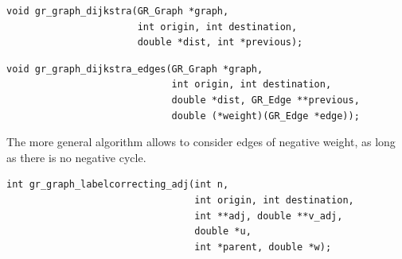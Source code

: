 \begin{verbatim}
void gr_graph_dijkstra(GR_Graph *graph,
                       int origin, int destination,
                       double *dist, int *previous);
\end{verbatim}

\begin{verbatim}
void gr_graph_dijkstra_edges(GR_Graph *graph,
                             int origin, int destination,
                             double *dist, GR_Edge **previous,
                             double (*weight)(GR_Edge *edge));
\end{verbatim}

The more general algorithm allows to consider edges of negative weight, as long as there is no negative cycle.
\begin{verbatim}
int gr_graph_labelcorrecting_adj(int n,
                                 int origin, int destination,
                                 int **adj, double **v_adj,
                                 double *u,
                                 int *parent, double *w);
\end{verbatim}

